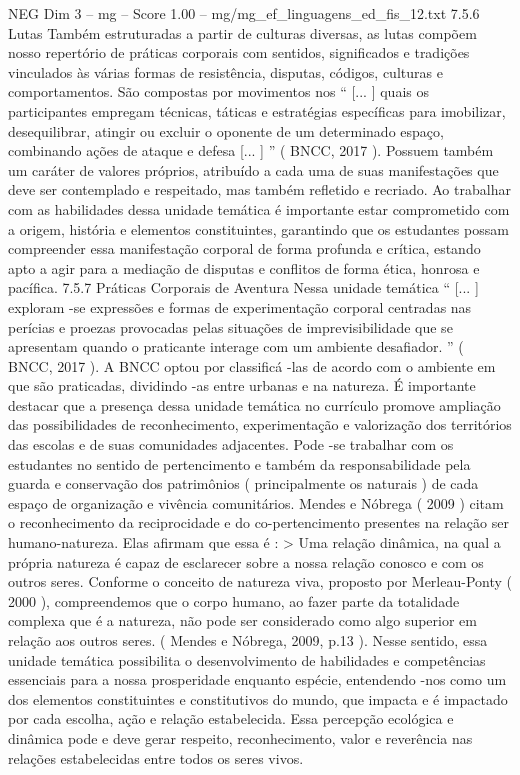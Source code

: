 \begin{textsample}{NEG Dim 3 – mg – Score 1.00 – mg/mg\_ef\_linguagens\_ed\_fis\_12.txt}  \label{ex:f3_neg_028}
7.5.6 Lutas Também estruturadas a partir de culturas diversas, as lutas compõem nosso repertório de práticas corporais com sentidos, significados e tradições vinculados às várias formas de resistência, disputas, códigos, culturas e comportamentos.
São compostas por movimentos nos “ [... ] quais os participantes empregam técnicas, táticas e estratégias específicas para imobilizar, desequilibrar, atingir ou excluir o oponente de um determinado espaço, combinando ações de ataque e defesa [... ] ” ( BNCC, 2017 ).
Possuem também um caráter de valores próprios, atribuído a cada uma de suas manifestações que deve ser contemplado e respeitado, mas também refletido e recriado.
Ao trabalhar com as habilidades dessa unidade temática é importante estar comprometido com a origem, história e elementos constituintes, garantindo que os estudantes possam compreender essa manifestação corporal de forma profunda e crítica, estando apto a agir para a mediação de disputas e conflitos de forma ética, honrosa e pacífica. 7.5.7 Práticas Corporais de Aventura Nessa unidade temática “ [... ] exploram -se expressões e formas de experimentação corporal centradas nas perícias e proezas provocadas pelas situações de imprevisibilidade que se apresentam quando o praticante interage com um ambiente desafiador. ” ( BNCC, 2017 ).
A BNCC optou por classificá -las de acordo com o ambiente em que são praticadas, dividindo -as entre urbanas e na natureza.
É importante destacar que a presença dessa unidade temática no currículo promove ampliação das possibilidades de reconhecimento, experimentação e valorização dos territórios das escolas e de suas comunidades adjacentes.
Pode -se trabalhar com os estudantes no sentido de pertencimento e também da responsabilidade pela guarda e conservação dos patrimônios ( principalmente os naturais ) de cada espaço de organização e vivência comunitários.
Mendes e Nóbrega ( 2009 ) citam o reconhecimento da reciprocidade e do co-pertencimento presentes na relação ser humano-natureza.
Elas afirmam que essa é : > Uma relação dinâmica, na qual a própria natureza é capaz de esclarecer sobre a nossa relação conosco e com os outros seres.
Conforme o conceito de natureza viva, proposto por Merleau-Ponty ( 2000 ), compreendemos que o corpo humano, ao fazer parte da totalidade complexa que é a natureza, não pode ser considerado como algo superior em relação aos outros seres. ( Mendes e Nóbrega, 2009, p.13 ).
Nesse sentido, essa unidade temática possibilita o desenvolvimento de habilidades e competências essenciais para a nossa prosperidade enquanto espécie, entendendo -nos como um dos elementos constituintes e constitutivos do mundo, que impacta e é impactado por cada escolha, ação e relação estabelecida.
Essa percepção ecológica e dinâmica pode e deve gerar respeito, reconhecimento, valor e reverência nas relações estabelecidas entre todos os seres vivos.

\end{textsample}
